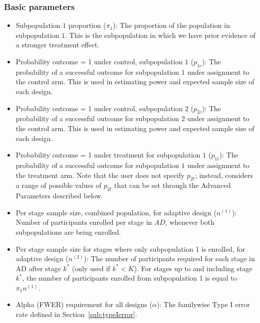\documentclass[article]{jss}
\begin{document}
\subsubsection{Basic parameters} 
\label{sub:basic-params}
\begin{itemize} 

\item Subpopulation $1$ proportion ($π_1$): The proportion of the population in subpopulation $1$. This is the subpopulation in which we have prior evidence of a stronger treatment effect. 

\item Probability outcome = 1 under control, subpopulation $1$ ($p_{1c}$): The probability of a successful outcome for subpopulation $1$ under assignment to the control arm. This is used in estimating power and expected sample size of each design.

\item Probability outcome = 1 under control, subpopulation $2$ ($p_{2c}$): The probability of a successful outcome  for subpopulation $2$ under assignment to the control arm. This is used in estimating power and expected sample size of each design.

\item Probability outcome = 1 under treatment for subpopulation $1$ ($p_{1t}$): The probability of a successful outcome for  subpopulation $1$ under assignment to the treatment arm. Note that the user does not specify $p_{2t}$; instead,  considers a range of possible values of $p_{2t}$ that can be set through the Advanced Parameters described below.

\item Per stage sample size, combined population, for adaptive design ($n^{(1)}$): Number of participants enrolled per stage in $AD$, whenever both subpopulations are being enrolled.

\item Per stage sample size for stages where only subpopulation 1 is enrolled, for adaptive design ($n^{(2)}$): The number of participants required for each stage in AD after stage $k^*$ (only used if $k^* < K$). For stages up to and including stage $k^*$, the number of participants enrolled from subpopulation 1 is equal to $\pi_1 n^{(1)}$.


\item Alpha (FWER) requirement for all designs ($α$): The familywise Type I error rate defined in Section~\ref{sub:typeIerror}. 


\end{itemize}
\end{document}
